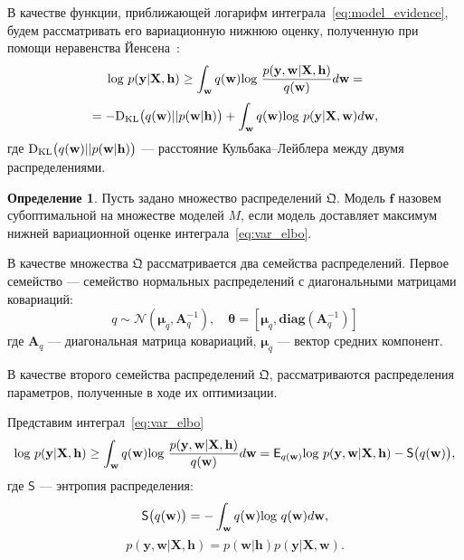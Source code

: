 \documentclass[11pt, a5paper]{dissert}
\theoremstyle{definition}
\newtheorem{defin}{Определение}
\begin{document}
{В качестве функции, приближающей логарифм интеграла~\eqref{eq:model_evidence}, будем рассматривать его вариационную нижнюю оценку, полученную при помощи неравенства Йенсена~\cite{bishop}:
\begin{equation} 
\label{eq:var_elbo}
\textnormal{log}~p(\mathbf{y}|\mathbf{X},\mathbf{h})   \geq	\int_{\mathbf{w}} q(\mathbf{w})\textnormal{log}~\frac{p(\mathbf{y},\mathbf{w}|\mathbf{X},\mathbf{h})}{q(\mathbf{w})}d\mathbf{w} =
\end{equation} 
$$
= -\textnormal{D}_\textnormal{KL} \bigl(q(\mathbf{w})||p(\mathbf{w}|\mathbf{h})\bigr) + \int_{\mathbf{w}} q(\mathbf{w})\textnormal{log}~{p(\mathbf{y}|\mathbf{X},\mathbf{w})} d \mathbf{w},
$$
где $\textnormal{D}_\textnormal{KL}\bigl(q(\mathbf{w})||p(\mathbf{w} |\mathbf{h})\bigr)$ --- расстояние Кульбака--Лейблера между двумя распределениями.


\begin{defin} Пусть задано множество распределений $\mathfrak{Q}$. Модель $\mathbf{f}$ назовем субоптимальной на множестве моделей $M$, если модель доставляет максимум нижней вариационной оценке интеграла~\eqref{eq:var_elbo}.
\end{defin}

В качестве множества $\mathfrak{Q}$ рассматривается два семейства распределений.
Первое семейство --- семейство нормальных распределений с диагональными матрицами ковариаций:
\begin{equation}
\label{eq:diag}
	q \sim \mathcal{N}(\boldsymbol{\mu}_q, \mathbf{A}^{-1}_q),\quad\boldsymbol{\theta}=[\boldsymbol{\mu}_q, \textbf{diag}(\mathbf{A}^{-1}_q)]
\end{equation}
где $\mathbf{A}_q$ --- диагональная матрица ковариаций, $\boldsymbol{\mu}_q$ --- вектор средних компонент.

В качестве второго семейства распределений $\mathfrak{Q}$, рассматриваются распределения параметров, полученные в ходе их оптимизации.

Представим интеграл~\eqref{eq:var_elbo}
\begin{equation}
\label{eq:var_elbo_entropy}
 \textnormal{log}~p(\mathbf{y}|\mathbf{X},\mathbf{h}) \geq \int_\mathbf{w} q(\mathbf{w})\textnormal{log}~\frac{p(\mathbf{y},\mathbf{w}|\mathbf{X}, \mathbf{h})}{q(\mathbf{w})}d\mathbf{w} =  \mathsf{E}_{q(\mathbf{w)}} \textnormal{log~}p (\mathbf{y}, \mathbf{w}|\mathbf{X}, \mathbf{h}) - \mathsf{S}\bigl({q(\mathbf{w)}}\bigr),
\end{equation}
где $\mathsf{S}$ --- энтропия распределения:
\[
\mathsf{S}\bigl({q(\mathbf{w)}}\bigr) = - \int_{\mathbf{w}} q(\mathbf{w})\textnormal{log}~q(\mathbf{w})d\mathbf{w},
\]
$$p (\mathbf{y}, \mathbf{w}|\mathbf{X}, \mathbf{h}) = p (\mathbf{w}| \mathbf{h}) p (\mathbf{y}|\mathbf{X}, \mathbf{w}).$$


}
\end{document}
